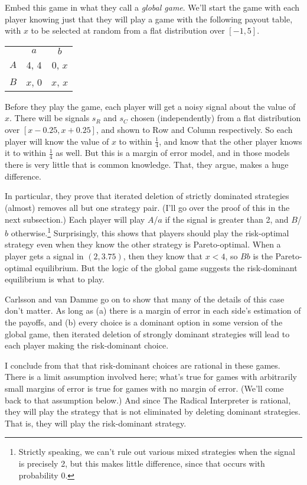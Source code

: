 \documentclass[11pt,]{book}
\let\rmarkdownfootnote\footnote%
\def\footnote{\protect\rmarkdownfootnote}
\def\toprule{}
\def\bottomrule{}
\begin{document}
Embed this game in what they call a \emph{global game}. We'll start the game with each player knowing just that they will play a game with the following payout table, with \(x\) to be selected at random from a flat distribution over \([-1, 5]\).

\begin{longtable}[]{@{}lcc@{}}
\toprule
\endhead
& \(a\) & \(b\)\tabularnewline
\(A\) & 4, 4 & 0, \(x\)\tabularnewline
\(B\) & \(x\), 0 & \(x\), \(x\)\tabularnewline
\bottomrule
\end{longtable}

Before they play the game, each player will get a noisy signal about the value of \(x\). There will be signals \(s_R\) and \(s_C\) chosen (independently) from a flat distribution over \([x - 0.25, x + 0.25]\), and shown to Row and Column respectively. So each player will know the value of \(x\) to within \(\frac{1}{4}\), and know that the other player knows it to within \(\frac{1}{4}\) as well. But this is a margin of error model, and in those models there is very little that is common knowledge. That, they argue, makes a huge difference.

In particular, they prove that iterated deletion of strictly dominated strategies (almost) removes all but one strategy pair. (I'll go over the proof of this in the next subsection.) Each player will play \(A\)/\(a\) if the signal is greater than 2, and \(B\)/\(b\) otherwise.\footnote{Strictly speaking, we can't rule out various mixed strategies when the signal is precisely 2, but this makes little difference, since that occurs with probability 0.} Surprisingly, this shows that players should play the risk-optimal strategy even when they know the other strategy is Pareto-optimal. When a player gets a signal in \((2, 3.75)\), then they know that \(x < 4\), so \(Bb\) is the Pareto-optimal equilibrium. But the logic of the global game suggests the risk-dominant equilibrium is what to play.

Carlsson and van Damme go on to show that many of the details of this case don't matter. As long as (a) there is a margin of error in each side's estimation of the payoffs, and (b) every choice is a dominant option in some version of the global game, then iterated deletion of strongly dominant strategies will lead to each player making the risk-dominant choice.

I conclude from that that risk-dominant choices are rational in these games. There is a limit assumption involved here; what's true for games with arbitrarily small margins of error is true for games with no margin of error. (We'll come back to that assumption below.) And since The Radical Interpreter is rational, they will play the strategy that is not eliminated by deleting dominant strategies. That is, they will play the risk-dominant strategy.
\end{document}
